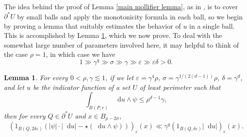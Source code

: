 \documentclass[reqno,11pt]{amsart}
\newcommand*\dif{\mathop{}\!\mathrm{d}}
\newtheorem{lemma}[theorem]{Lemma}
\theoremstyle{definition}
\numberwithin{equation}{section}
\begin{document}
The idea behind the proof of Lemma \ref{main mollifier lemma}, as in \cite{Giusti77}, is to cover $\partial^* U$ by small balls and apply the monotonicity formula in each ball, so we begin by proving a lemma that suitably estimates the behavior of $u$ in a single ball.
This is accomplished by Lemma \ref{mollifier sublemma}, which we now prove.
To deal with the somewhat large number of parameters involved here, it may helpful to think of the case $\rho = 1$, in which case we have
$$1 \gg \gamma^q \gg \sigma \gg \gamma \gg \varepsilon \gg \varepsilon \delta > 0.$$

\begin{lemma}\label{mollifier sublemma}
For every $0 < \rho, \gamma \lesssim 1$, if we let $\varepsilon = \gamma^4 \rho$, $\sigma = \gamma^{1/(2(d - 1))} \rho$, $\delta = \gamma^d$, and let $u$ be the indicator function of a set $U$ of least perimeter such that
\begin{equation}\label{hypothesis on mollifier sublemma}
\int_{B(P, r)} \dif u \wedge \psi \leq \rho^{d - 1} \gamma,
\end{equation}
then for every $Q \in \partial^* U$ and $x \in B_{\rho - 2\sigma}$,
$$(1_{B(Q, 2\delta\varepsilon)}(|\psi| \cdot |\dif u| - \star(\dif u \wedge \psi)))_\varepsilon(x) \ll \gamma^q (1_{B(Q, \delta\varepsilon)} |\dif u|)_\varepsilon(x).$$
\end{lemma}
\end{document}

